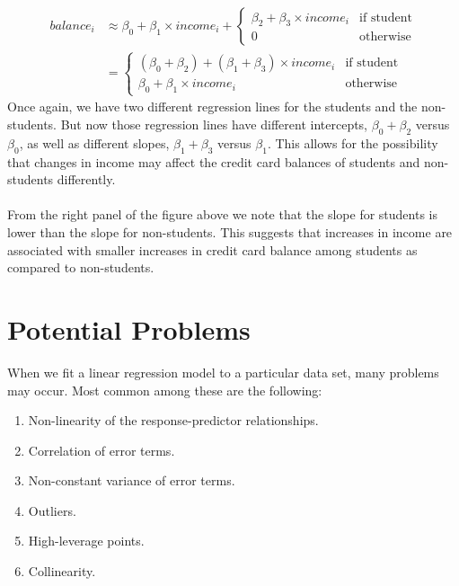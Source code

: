 \[
\begin{split}
    balance_i & \approx \beta_0 + \beta_1 \times income_i + \begin{cases}
    \beta_2 + \beta_3 \times income_i & \text{if student}\\
    0 & \text{otherwise}
\end{cases}\\
    & = \begin{cases}
        (\beta_0 + \beta_2)+(\beta_1 + \beta_3) \times income_i & \text{if student}\\
        \beta_0 + \beta_1 \times income_i & \text{otherwise}
    \end{cases}
\end{split}
\]
Once again, we have two different regression lines for the students and the non-students. But now those regression lines have different intercepts, $\beta_0+\beta_2$ versus $\beta_0$, as well as different slopes, $\beta_1+\beta_3$ versus $\beta_1$. This allows for the possibility that changes in income may affect the credit card balances of students and non-students differently.\\\\
From the right panel of the figure above we note that the slope for students is lower than the slope for non-students. This suggests that increases in income are associated with smaller increases in credit card balance among students as compared to non-students.

\section{Potential Problems}
When we fit a linear regression model to a particular data set, many problems may occur. Most common among these are the following:
\begin{enumerate}
    \item Non-linearity of the response-predictor relationships.
    \item Correlation of error terms.
    \item Non-constant variance of error terms.
    \item Outliers.
    \item High-leverage points.
    \item Collinearity.
\end{enumerate}

